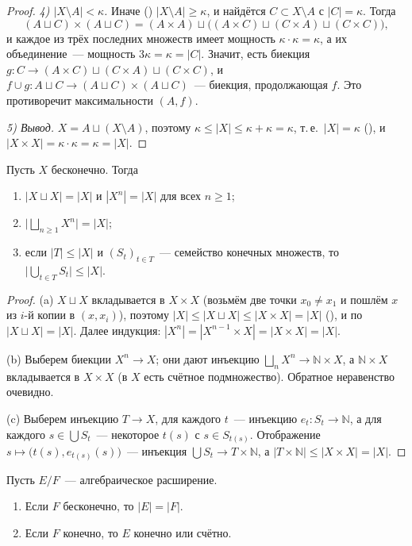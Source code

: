 \begin{proof}
\emph{4) $|X\setminus A|<\kappa$.} Иначе () $|X\setminus A|\ge\kappa$, и найдётся $C\subset X\setminus A$ с
$|C|=\kappa$. Тогда
\[
(A\sqcup C)\times(A\sqcup C)=(A\times A)\sqcup\bigl((A\times C)\sqcup(C\times A)\sqcup(C\times C)\bigr),
\]
и каждое из трёх последних множеств имеет мощность $\kappa\cdot\kappa=\kappa$, а их объединение~--- мощность
$3\kappa=\kappa=|C|$. Значит, есть биекция $g\colon C\to(A\times C)\sqcup(C\times A)\sqcup(C\times C)$, и
$f\cup g\colon A\sqcup C\to(A\sqcup C)\times(A\sqcup C)$~--- биекция, продолжающая $f$. Это противоречит
максимальности $(A,f)$.

\emph{5) Вывод.} $X=A\sqcup(X\setminus A)$, поэтому $\kappa\le|X|\le\kappa+\kappa=\kappa$, т.\,е.\ $|X|=\kappa$ (), и
$|X\times X|=\kappa\cdot\kappa=\kappa=|X|$.
\end{proof}

\begin{corollary}[6.4g]
Пусть $X$ бесконечно. Тогда
\begin{enumerate}[label=(\alph*)]
\item $|X\sqcup X|=|X|$ и $|X^n|=|X|$ для всех $n\ge1$;
\item $\bigl|\bigsqcup_{n\ge1}X^n\bigr|=|X|$;
\item если $|T|\le|X|$ и $(S_t)_{t\in T}$~--- семейство конечных множеств, то $\bigl|\bigcup_{t\in T}S_t\bigr|\le|X|$.
\end{enumerate}
\end{corollary}

\begin{proof}
(a) $X\sqcup X$ вкладывается в $X\times X$ (возьмём две точки $x_0\ne x_1$ и пошлём $x$ из $i$-й копии в $(x,x_i)$),
поэтому $|X|\le|X\sqcup X|\le|X\times X|=|X|$ (), и по 
$|X\sqcup X|=|X|$. Далее индукция: $|X^n|=|X^{n-1}\times X|=|X\times X|=|X|$.

(b) Выберем биекции $X^n\to X$; они дают инъекцию $\bigsqcup_nX^n\to\mathbb N\times X$, а $\mathbb N\times X$
вкладывается в $X\times X$ (в $X$ есть счётное подмножество). Обратное неравенство очевидно.

(c) Выберем инъекцию $T\to X$, для каждого $t$~--- инъекцию $e_t\colon S_t\to\mathbb N$, а для каждого
$s\in\bigcup S_t$~--- некоторое $t(s)$ с $s\in S_{t(s)}$. Отображение $s\mapsto\bigl(t(s),e_{t(s)}(s)\bigr)$~---
инъекция $\bigcup S_t\to T\times\mathbb N$, а $|T\times\mathbb N|\le|X\times X|=|X|$.
\end{proof}

\begin{proposition}[6.4h]
Пусть $E/F$~--- алгебраическое расширение.
\begin{enumerate}[label=(\alph*)]
\item Если $F$ бесконечно, то $|E|=|F|$.
\item Если $F$ конечно, то $E$ конечно или счётно.
\end{enumerate}
\end{proposition}

